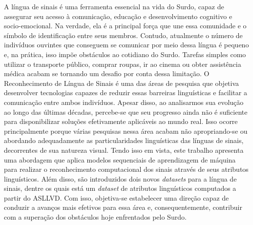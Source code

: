 \begin{resumo}[Resumo]
  \noindent
  A língua de sinais é uma ferramenta essencial na vida do Surdo, capaz de assegurar seu acesso à comunicação, educação e desenvolvimento cognitivo e socio-emocional.
  Na verdade, ela é a principal força que une essa comunidade e o símbolo de identificação entre seus membros.
  Contudo, atualmente o número de indivíduos ouvintes que conseguem se comunicar por meio dessa língua é pequeno e, na prática, isso impõe obstáculos ao cotidiano do Surdo.
  Tarefas simples como utilizar o transporte público, comprar roupas, ir ao cinema ou obter assistência médica acabam se tornando um desafio por conta dessa limitação.
  O Reconhecimento de Língua de Sinais é uma das áreas de pesquisa que objetiva desenvolver tecnologias capazes de reduzir essas barreiras linguísticas e facilitar a comunicação entre ambos indivíduos.
  Apesar disso, ao analisarmos sua evolução ao longo das últimas décadas, percebe-se que seu progresso ainda não é suficiente para disponibilizar soluções efetivamente aplicáveis ao mundo real.
  Isso ocorre principalmente porque várias pesquisas nessa área acabam não apropriando-se ou abordando adequadamente as particularidades linguísticas das línguas de sinais, decorrentes de sua natureza visual.
  Tendo isso em vista, este trabalho apresenta uma abordagem que aplica modelos sequenciais de aprendizagem de máquina para realizar o reconhecimento computacional dos sinais através de seus atributos linguísticos. Além disso, são introduzidos dois novos \textit{datasets} para a língua de sinais, dentre os quais está um \textit{dataset} de atributos linguísticos computados a partir do ASLLVD.
  Com isso, objetiva-se estabelecer uma direção capaz de conduzir a avanços mais efetivos para essa área e, consequentemente, contribuir com a superação dos obstáculos hoje enfrentados pelo Surdo.





\end{resumo}
